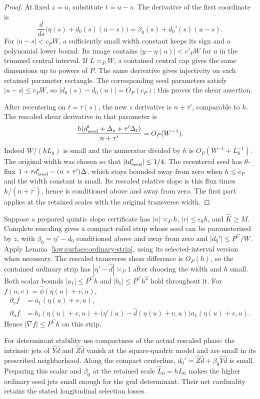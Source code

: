 \documentclass[11pt]{amsart}
\theoremstyle{definition}
\theoremstyle{remark}
\numberwithin{equation}{section}
\begin{document}
\begin{proof}
At fixed $z=u$, substitute $t=u-s$. The derivative of the first coordinate is
\[
\frac{d}{ds}\bigl(\eta(s)+d_0(s)(u-s)\bigr)=\beta_0(s)+d_0'(s)(u-s).
\]
For $|u-s|<c_PW$, a sufficiently small width constant keeps its sign and a polynomial lower bound. Its image contains $|y-\eta(u)|<c'_PW$ for $u$ in the trimmed central interval. If $L\asymp_PW$, a contained central cap gives the same dimensions up to powers of $P$. The same derivative gives injectivity on each retained parameter rectangle. The corresponding seed parameters satisfy $|u-s|\le c_PW$, so $|d_0(s)-d_0(u)|=O_P(c_P)$; this proves the shear assertion.

After recentering on $t=\tau(s)$, the new $z$ derivative is $n+\tau'$, comparable to $h$. The rescaled shear derivative in that parameter is
\[
\frac{h(d_{\rm seed}'+\Delta_s+\tau'\Delta_t)}{n+\tau'}=O_P(W^{-1}).
\]
Indeed $W/(hL_0)$ is small and the numerator divided by $h$ is $O_P(W^{-1}+L_0^{-1})$. The original width was chosen so that $|t d_{\rm seed}^\prime|\le1/4$. The recentered seed has $\theta$-flux $1+\tau d_{\rm seed}^\prime-(n+\tau^\prime)\Delta$, which stays bounded away from zero when $h\le c_P$ and the width constant is small. Its rescaled relative slope is this flux times $h/(n+\tau^\prime)$, hence is conditioned above and away from zero. The first part applies at the retained scales with the original transverse width.
\end{proof}

Suppose a prepared quintic slope certificate has $|n|\asymp_Ph$, $|r|\le\epsilon_0h$, and $\widehat K\ge M$. Complete rescaling gives a compact ruled strip whose seed can be parameterized by $z$, with $\beta_0=\eta'-d_0$ conditioned above and away from zero and $|d_0'|\le P^C/W$. Apply Lemma~\ref{low:surface:ordinary-strip}, using its selected-interval version when necessary. The rescaled transverse shear difference is $O_P(h)$, so the contained ordinary strip has $|\eta'-\widehat d|\asymp_P1$ after choosing the width and $h$ small. Both scalar bounds $|a_1|\le P^Ch$ and $|b_1|\le P^Ch^2$ hold throughout it. For $f(u,v)=\widehat\phi(\eta(u)+v,u)$,
\[
\begin{aligned}
\partial_vf&=a_1(\eta(u)+v,u),\\
\partial_uf&=b_1(\eta(u)+v,u)+\bigl(\eta'(u)-\widehat d(\eta(u)+v,u)\bigr)a_1(\eta(u)+v,u).
\end{aligned}
\]
Hence $|\nabla f|\le P^Ch$ on this strip.

For determinant stability use compactness of the actual rescaled phase: the intrinsic jets of $\widehat Y\widehat d$ and $\widehat Z\widehat d$ vanish at the square-quadric model and are small in its prescribed neighborhood. Along the compact centerline, $d_0'=\widehat Z\widehat d+\beta_0\widehat Y\widehat d$ is small. Preparing this scalar and $\beta_0$ at the retained scale $\widehat L_0=hL_0$ makes the higher ordinary seed jets small enough for the grid determinant. Their net cardinality retains the stated longitudinal selection losses.
\end{document}
